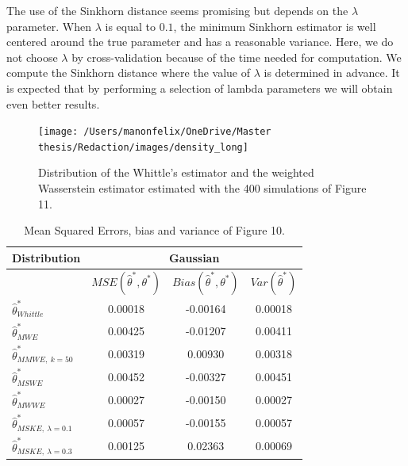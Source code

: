 \documentclass[
  11pt,
]{article}
\begin{document}
The use of the Sinkhorn distance seems promising but depends on the
\(\lambda\) parameter. When \(\lambda\) is equal to \(0.1\), the minimum
Sinkhorn estimator is well centered around the true parameter and has a
reasonable variance. Here, we do not choose \(\lambda\) by
cross-validation because of the time needed for computation. We compute
the Sinkhorn distance where the value of \(\lambda\) is determined in
advance. It is expected that by performing a selection of lambda
parameters we will obtain even better results.

\begin{figure}

{\centering \texttt{[image: /Users/manonfelix/OneDrive/Master thesis/Redaction/images/density\_long]} 

}

\caption{Distribution of the Whittle's estimator and the weighted Wasserstein estimator estimated with the 400 simulations of Figure 11.}\label{fig:density_long_gauss}
\end{figure}

\begin{table}[h]
\centering
\begin{tabular}{|l|c|c|c|}
\hline
\textbf{Distribution}                   & \multicolumn{3}{c|}{\textbf{Gaussian}}                                                            \\ \hline
\textbf{}                               & $MSE(\hat \theta^*, \theta^*)$ & $Bias(\hat \theta^*, \theta^*)$ & $Var(\hat \theta^*)$ \\ \hline
$\hat \theta^*_{Whittle}$               & 0.00018                        & -0.00164                         & 0.00018                        \\ \hline
$\hat \theta^*_{MWE}$                   & 0.00425                        & -0.01207                         & 0.00411                        \\ \hline
$\hat \theta^*_{MMWE, \ k = 50}$        & 0.00319                        & 0.00930                         & 0.00318                        \\ \hline
$\hat \theta^*_{MSWE}$                  & 0.00452                        & -0.00327                        & 0.00451                        \\ \hline
$\hat \theta^*_{MWWE}$                  & 0.00027                        & -0.00150                        & 0.00027                        \\ \hline
$\hat \theta^*_{MSKE, \ \lambda = 0.1}$ & 0.00057                        & -0.00155                        & 0.00057                        \\ \hline
$\hat \theta^*_{MSKE, \ \lambda = 0.3}$ & 0.00125                        & 0.02363                         & 0.00069                        \\ \hline
\end{tabular}
\caption{Mean Squared Errors, bias and variance of Figure 10.}
\label{tab:farima_mse_gaussian}
\end{table}
\end{document}
